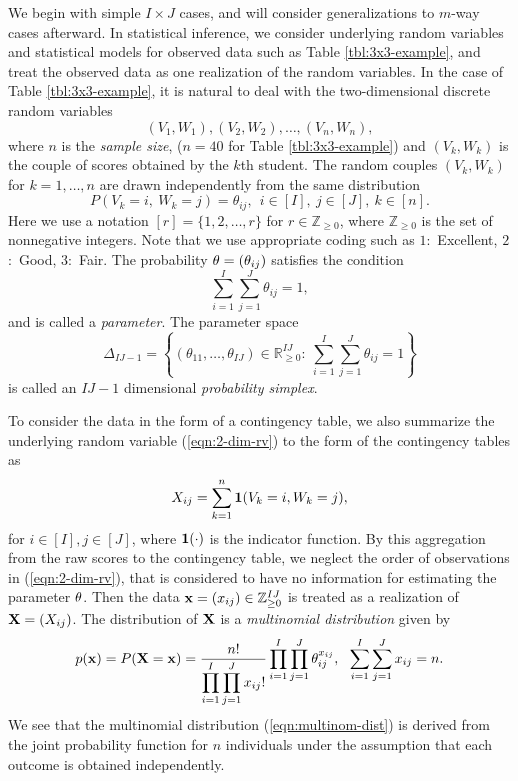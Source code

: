 \documentclass[12pt]{article}
\theoremstyle{definition}
\def\Bx{{\bf x}}
\def\BX{{\bf X}}
\def\Btheta{{\bf \theta}}
\def\Bone{{\bf 1}}
\begin{document}
We begin with simple $I\times J$ cases, and will consider
generalizations to $m$-way cases afterward.
In statistical inference, we consider underlying random variables and
statistical models for observed data such as Table
\ref{tbl:3x3-example}, and treat the observed data as one realization of
the random variables. In the case of Table \ref{tbl:3x3-example}, it is
natural to deal with the two-dimensional discrete random variables 
\begin{equation}
(V_1, W_1), (V_2, W_2),\ldots,(V_n,W_n), 
\label{eqn:2-dim-rv}
\end{equation}
where $n$ is the {\it sample size}, ($n=40$ for Table
\ref{tbl:3x3-example}) and 
$(V_k,W_k)$ is the couple of 
scores obtained by the $k$th student. The random couples $(V_k, W_k)$
for $k = 1,\ldots,n$ are drawn
independently from
the same distribution
\[
 P(V_k = i,\ W_k = j) = \theta_{ij},\ \  i \in [I],\ j \in [J],\ k
 \in [n].
\]
Here we use a notation $[r] = \{1,2,\ldots,r\}$ for $r \in
\mathbb{Z}_{\geq 0}$, where $\mathbb{Z}_{\geq 0}$ is the set of
nonnegative integers. Note that we use appropriate coding such as $1$:\
Excellent, $2$:\ Good, $3$:\ Fair. The probability $\Btheta =
(\theta_{ij})$ satisfies the condition
\[
 \sum_{i=1}^{I}\sum_{j=1}^{J}\theta_{ij} = 1,
\]
and is 
called a {\it parameter}. The parameter space
\[
 \Delta_{IJ-1} = \left\{(\theta_{11},\ldots,\theta_{IJ}) \in
      \mathbb{R}^{IJ}_{\geq 0}:\ \sum_{i=1}^{I}\sum_{j=1}^{J}
     \theta_{ij} = 1\right\}
\]
is called an $IJ-1$ dimensional {\it probability simplex}.

To consider the data in the form of a contingency table, 
we also summarize the underlying random variable
(\ref{eqn:2-dim-rv}) to the form of the contingency tables as
\[
 X_{ij} = \sum_{k = 1}^n\Bone(V_k = i, W_k = j),
\]
for $i \in [I], j \in [J]$, where $\Bone(\cdot)$ is the indicator
function. By this aggregation from the raw scores to the contingency
table, we neglect the order of
observations in (\ref{eqn:2-dim-rv}), that is considered to have no
information for estimating the parameter $\Btheta$. 
Then the data $\Bx = (x_{ij}) \in \mathbb{Z}^{IJ}_{\geq 0}$ is treated as a
realization of $\BX = (X_{ij})$. 
The distribution of $\BX$ is a {\it multinomial distribution} given by
\begin{equation}
 p(\Bx) = P(\BX = \Bx) =
      \frac{n!}{\displaystyle\prod_{i=1}^I\prod_{j=1}^Jx_{ij}!}
\prod_{i=1}^I\prod_{j=1}^J\theta_{ij}^{x_{ij}},\ \ 
 \sum_{i=1}^I\sum_{j=1}^Jx_{ij} = n.
\label{eqn:multinom-dist}
\end{equation}
We see that the multinomial distribution (\ref{eqn:multinom-dist}) is
derived from the joint probability function for $n$ individuals
under the
assumption that each outcome is obtained independently. 
\end{document}
